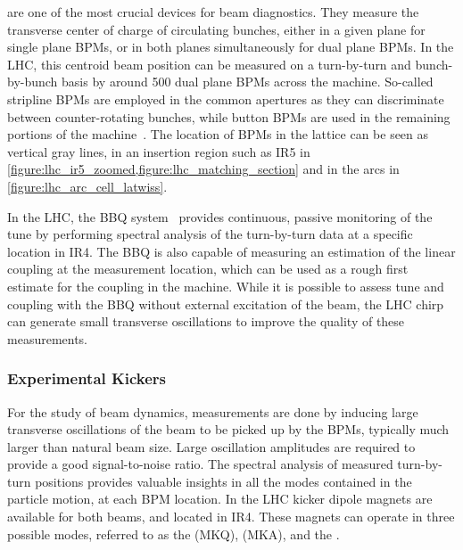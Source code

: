  are one of the most crucial devices for beam diagnostics.
They measure the transverse center of charge of circulating bunches, either in a given plane for single plane BPMs, or in both planes simultaneously for dual plane BPMs.
In the \gls{LHC}, this centroid beam position can be measured on a turn-by-turn and bunch-by-bunch basis by around \num{500} dual plane \glspl{BPM} across the machine.
So-called stripline BPMs are employed in the common apertures as they can discriminate between counter-rotating bunches, while button BPMs are used in the remaining portions of the machine~\cite{BOOK:Bruning:LHC_Design_Report_Main_Ring}. 
The location of BPMs in the lattice can be seen as vertical gray lines, in an insertion region such as IR\num{5} in \cref{figure:lhc_ir5_zoomed,figure:lhc_matching_section} and in the arcs in \cref{figure:lhc_arc_cell_latwiss}.

In the LHC, the \gls{BBQ} system~\cite{CERN:Boccardi:LHC_Transverse_Diagnostics_Systems,CERN:Boccardi:LHC_BBQ_Tune_Chromaticity_Systems} provides continuous, passive monitoring of the tune by performing spectral analysis of the turn-by-turn data at a specific location in IR\num{4}.
The \gls{BBQ} is also capable of measuring an estimation of the linear coupling at the measurement location, which can be used as a rough first estimate for the coupling in the machine.
While it is possible to assess tune and coupling with the BBQ without external excitation of the beam, the LHC chirp can generate small transverse oscillations to improve the quality of these measurements.

\subsubsection*{Experimental Kickers}

For the study of beam dynamics, measurements are done by inducing large transverse oscillations of the beam to be picked up by the \glspl{BPM}, typically much larger than natural beam size.
Large oscillation amplitudes are required to provide a good signal-to-noise ratio.
The spectral analysis of measured turn-by-turn positions provides valuable insights in all the modes contained in the particle motion, at each BPM location.
In the \gls{LHC} kicker dipole magnets are available for both beams, and located in IR\num{4}.
These magnets can operate in three possible modes, referred to as the  (MKQ),  (MKA), and the .

